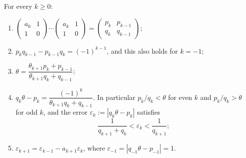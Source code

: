 \begin{lemma}\label{lem:ch8:basic}
For every $k\geq0$:
\begin{enumerate}[label=(\roman*),leftmargin=2em]
\item $\begin{pmatrix}a_0&1\\1&0\end{pmatrix}\cdots
  \begin{pmatrix}a_k&1\\1&0\end{pmatrix}
  =\begin{pmatrix}p_k&p_{k-1}\\q_k&q_{k-1}\end{pmatrix}$;
\item $p_kq_{k-1}-p_{k-1}q_k=(-1)^{k-1}$, and this also holds for $k=-1$;
\item $\theta=\dfrac{\theta_{k+1}p_k+p_{k-1}}{\theta_{k+1}q_k+q_{k-1}}$;
\item $q_k\theta-p_k=\dfrac{(-1)^k}{\theta_{k+1}q_k+q_{k-1}}$. In particular
  $p_k/q_k<\theta$ for even $k$ and $p_k/q_k>\theta$ for odd $k$, and the
  error $\varepsilon_k:=|q_k\theta-p_k|$ satisfies
  \[
    \frac{1}{q_{k+1}+q_k}<\varepsilon_k<\frac{1}{q_{k+1}};
  \]
\item $\varepsilon_{k+1}=\varepsilon_{k-1}-a_{k+1}\varepsilon_k$, where
  $\varepsilon_{-1}=|q_{-1}\theta-p_{-1}|=1$.
\end{enumerate}
\end{lemma}


